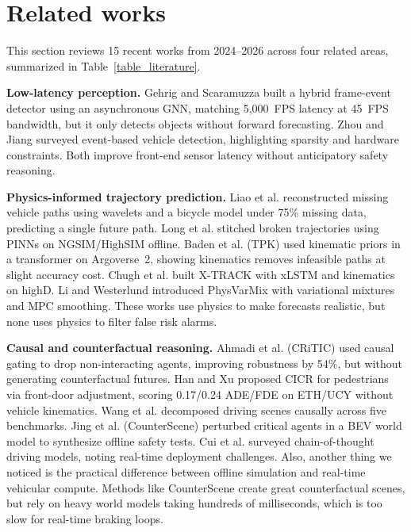 \documentclass[preprint,12pt]{elsarticle}
\begin{document}
\section{Related works} \label{section2}
This section reviews 15 recent works from 2024--2026 across four related areas, summarized in Table~\ref{table_literature}.

\textbf{Low-latency perception.} Gehrig and Scaramuzza \cite{gehrig2024low} built a hybrid frame-event detector using an asynchronous GNN, matching 5,000~FPS latency at 45~FPS bandwidth, but it only detects objects without forward forecasting. Zhou and Jiang \cite{zhou2024event} surveyed event-based vehicle detection, highlighting sparsity and hardware constraints. Both improve front-end sensor latency without anticipatory safety reasoning.

\textbf{Physics-informed trajectory prediction.} Liao et al. \cite{liao2024physics} reconstructed missing vehicle paths using wavelets and a bicycle model under 75\% missing data, predicting a single future path. Long et al. \cite{long2024pinn} stitched broken trajectories using PINNs on NGSIM/HighSIM offline. Baden et al. \cite{baden2025tpk} (TPK) used kinematic priors in a transformer on Argoverse~2, showing kinematics removes infeasible paths at slight accuracy cost. Chugh et al. \cite{chugh2025xtrack} built X-TRACK with xLSTM and kinematics on highD. Li and Westerlund \cite{li2025physvarmix} introduced PhysVarMix with variational mixtures and MPC smoothing. These works use physics to make forecasts realistic, but none uses physics to filter false risk alarms.

\textbf{Causal and counterfactual reasoning.} Ahmadi et al. \cite{ahmadi2025critic} (CRiTIC) used causal gating to drop non-interacting agents, improving robustness by 54\%, but without generating counterfactual futures. Han and Xu \cite{han2025cicr} proposed CICR for pedestrians via front-door adjustment, scoring 0.17/0.24 ADE/FDE on ETH/UCY without vehicle kinematics. Wang et al. \cite{wang2025beyond} decomposed driving scenes causally across five benchmarks. Jing et al. \cite{jing2026counterscene} (CounterScene) perturbed critical agents in a BEV world model to synthesize offline safety tests. Cui et al. \cite{cui2025cot} surveyed chain-of-thought driving models, noting real-time deployment challenges. Also, another thing we noticed is the practical difference between offline simulation and real-time vehicular compute. Methods like CounterScene \cite{jing2026counterscene} create great counterfactual scenes, but rely on heavy world models taking hundreds of milliseconds, which is too slow for real-time braking loops.
\end{document}
